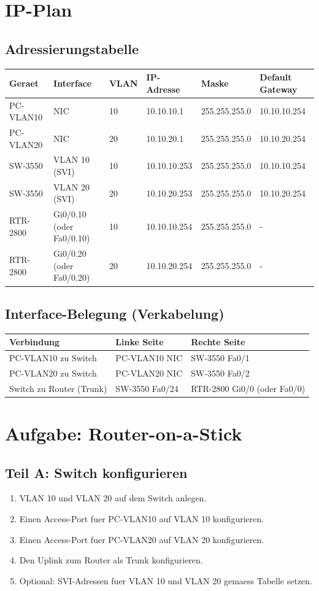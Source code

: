 \documentclass[11pt, oneside, numbers=noenddot]{scrbook}
\begin{document}
\chapter{IP-Plan}
\section{Adressierungstabelle}
\begin{longtable}{|l|l|l|l|l|l|}
\hline
Geraet & Interface & VLAN & IP-Adresse & Maske & Default Gateway \\
\hline
PC-VLAN10 & NIC & 10 & 10.10.10.1 & 255.255.255.0 & 10.10.10.254 \\
\hline
PC-VLAN20 & NIC & 20 & 10.10.20.1 & 255.255.255.0 & 10.10.20.254 \\
\hline
SW-3550 & VLAN 10 (SVI) & 10 & 10.10.10.253 & 255.255.255.0 & 10.10.10.254 \\
\hline
SW-3550 & VLAN 20 (SVI) & 20 & 10.10.20.253 & 255.255.255.0 & 10.10.20.254 \\
\hline
RTR-2800 & Gi0/0.10 (oder Fa0/0.10) & 10 & 10.10.10.254 & 255.255.255.0 & - \\
\hline
RTR-2800 & Gi0/0.20 (oder Fa0/0.20) & 20 & 10.10.20.254 & 255.255.255.0 & - \\
\hline
\end{longtable}

\section{Interface-Belegung (Verkabelung)}
\begin{longtable}{|l|l|l|}
\hline
Verbindung & Linke Seite & Rechte Seite \\
\hline
PC-VLAN10 zu Switch & PC-VLAN10 NIC & SW-3550 Fa0/1 \\
\hline
PC-VLAN20 zu Switch & PC-VLAN20 NIC & SW-3550 Fa0/2 \\
\hline
Switch zu Router (Trunk) & SW-3550 Fa0/24 & RTR-2800 Gi0/0 (oder Fa0/0) \\
\hline
\end{longtable}

\chapter{Aufgabe: Router-on-a-Stick}
\section{Teil A: Switch konfigurieren}
\begin{enumerate}
\item VLAN 10 und VLAN 20 auf dem Switch anlegen.
\item Einen Access-Port fuer PC-VLAN10 auf VLAN 10 konfigurieren.
\item Einen Access-Port fuer PC-VLAN20 auf VLAN 20 konfigurieren.
\item Den Uplink zum Router als Trunk konfigurieren.
\item Optional: SVI-Adressen fuer VLAN 10 und VLAN 20 gemaess Tabelle setzen.
\end{enumerate}
\end{document}
